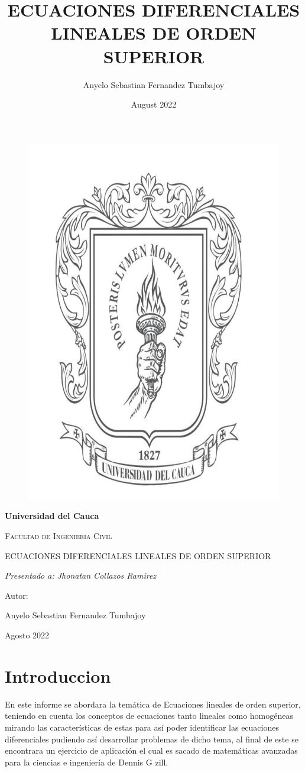 \documentclass{article}
\begin{document}
\begin{figure}
    \centering
    \includegraphics[width=0.3 \textwidth]{logo.pdf}
   
    \label{fig:my_label}
\end{figure}
\begin{titlepage}
\centering
{\bfseries\LARGE Universidad del Cauca \par}
\vspace{1cm}
{\scshape\Large Facultad de Ingenier\'ia Civil \par}
\vspace{2cm}
{\scshape\Huge ECUACIONES DIFERENCIALES LINEALES DE ORDEN SUPERIOR \par}
\vspace{2cm}
{\itshape\Large Presentado a: Jhonatan Collazos Ramirez  \par}
\vfill
{\Large Autor: \par}
{\Large Anyelo Sebastian Fernandez Tumbajoy\par}
\vfill
{\Large Agosto 2022 \par}
\end{titlepage}


\title{ECUACIONES DIFERENCIALES LINEALES DE ORDEN SUPERIOR}
\author{Anyelo Sebastian Fernandez Tumbajoy}

\date{August 2022}

\maketitle
 \tableofcontents
 \cleardoublepage
\section{Introduccion }
En este informe se abordara la temática de Ecuaciones lineales de orden superior, teniendo en cuenta los conceptos de ecuaciones tanto lineales como homogéneas mirando las características de estas para así poder identificar las ecuaciones diferenciales pudiendo así desarrollar problemas de dicho tema, al final de este se encontrara un ejercicio de aplicación el cual es sacado de matemáticas avanzadas para la ciencias e ingeniería de Dennis  G zill. 
\end{document}
